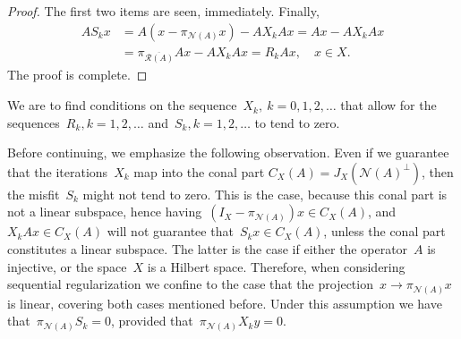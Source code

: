 \documentclass[12pt]{amsart}
\newcommand{\lr}[1]{\left(#1\right)}
\newcommand{\range}{\mathcal R}
\newcommand{\N}{\mathcal N}
\newcommand{\pr}{\pi_{\overline{\range(A)}}}
\theoremstyle{remark}
\begin{document}
\begin{proof}
The first two items are seen, immediately.
    Finally, 
\begin{align*}
A S_kx &= A\lr{x - \pi_{\N(A)}x} - A X_k A x
= A x - A X_k A x\\
&= \pr A x - A X_k Ax  = R_k A x,\quad x\in X.    
\end{align*}
The proof is complete.
\end{proof}

We are to find conditions on the
sequence~$X_{k},\ k=0,1,2,\dots$ that allow for the sequences~$R_{k}, k=1,2,\dots$ and~$S_{k}, k=1,2,\dots$ to tend to zero.
\par

Before continuing, we emphasize the following observation. Even if we guarantee that the iterations~$X_k$ map into the conal part $C_X(A)=J_X\lr{\N(A)^\perp}$, then the misfit~$S_k$ might not tend to zero. This is the case, because this conal part is not a  linear subspace, hence having~$\lr{I_X - \pi_{\N(A)}}x\in C_X(A) $, and~$X_k A x\in C_X(A)$ will not guarantee that~$S_k x \in C_X(A)$, unless the conal part constitutes a linear subspace. The latter is the case if either the operator~$A$ is injective, or the space~$X$ is a Hilbert space.
Therefore, when considering sequential regularization we confine to the case that the projection~$x \to \pi_{\N(A)}x$ is linear, covering both cases mentioned before. Under this assumption we have that~$\pi_{\N(A)} S_k =0$, provided that~$\pi_{\N(A)} X_k y=0$.
\end{document}
